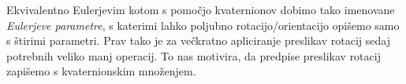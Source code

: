 \documentclass[a4paper,12pt]{article}
\def\Z{\mathbb{Z}} %
\def\R{\mathbb{R}} %
\def\C{\mathbb{C}} %
\def\H{\mathbb{H}} %
\def\E{\mathbb{E}} %
\begin{document}
Ekvivalentno Eulerjevim kotom s pomočjo kvaternionov dobimo tako imenovane \emph{Eulerjeve parametre}, s katerimi
lahko poljubno rotacijo/orientacijo opišemo samo s štirimi parametri. Prav tako je za večkratno apliciranje preslikav rotacij sedaj
potrebnih veliko manj operacij. To nas motivira, da predpise preslikav rotacij zapišemo s kvaternionskim množenjem.









\end{document}
